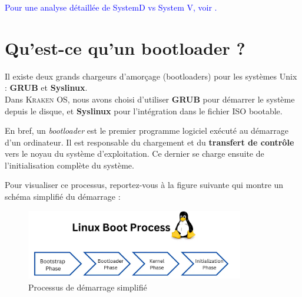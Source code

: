     

\textcolor{blue}{Pour une analyse détaillée de SystemD vs System V, voir \cite{systemV_systemD}.}


\section{Qu'est-ce qu'un bootloader ?}

Il existe deux grands chargeurs d'amorçage (bootloaders) pour les systèmes Unix : \textbf{GRUB} et \textbf{Syslinux}.  \\
Dans \textsc{Kraken OS}, nous avons choisi d’utiliser \textbf{GRUB} pour démarrer le système depuis le disque, et \textbf{Syslinux} pour l’intégration dans le fichier ISO bootable.  




\medskip
\noindent
En bref, un \textit{bootloader} est le premier programme logiciel exécuté au démarrage d’un ordinateur. Il est responsable du chargement et du \textbf{transfert de contrôle} vers le noyau du système d’exploitation.  
Ce dernier se charge ensuite de l’initialisation complète du système.

Pour visualiser ce processus, reportez-vous à la figure suivante qui montre un schéma simplifié du démarrage :

\begin{figure}[H]
  \centering
  \includegraphics[width=0.85\textwidth]{images_pfe/simplebootprocess.png}
  \caption{Processus de démarrage simplifié}
  \label{fig:botprocess}
\end{figure}



